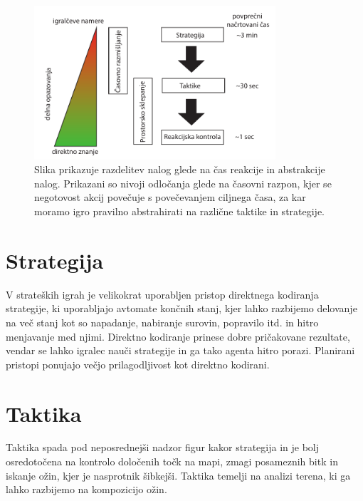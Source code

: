 \documentclass[a4paper, 12pt]{book}
\begin{document}
\begin{itemize}
\begin{itemize}
	\end{itemize}

	\begin{figure}[h]
		\begin{center}
			\includegraphics[width=0.8\textwidth]{photos/RazdelitevNalog.pdf}
		\end{center}
		\caption{Slika prikazuje razdelitev nalog glede na čas reakcije in abstrakcije nalog. 
			Prikazani so nivoji odločanja glede na časovni razpon, kjer se negotovost akcij povečuje s povečevanjem ciljnega časa, za kar moramo igro pravilno abstrahirati na različne taktike in strategije. }
		\label{picRazdelitevNalog}
	\end{figure}

\end{itemize}

\section{Strategija}
V strateških igrah je velikokrat uporabljen pristop direktnega kodiranja strategije, ki uporabljajo avtomate končnih stanj, kjer lahko razbijemo delovanje na več stanj kot so napadanje, nabiranje surovin, popravilo itd. in hitro menjavanje med njimi. 
Direktno kodiranje prinese dobre pričakovane rezultate, vendar se lahko igralec nauči strategije in ga tako agenta hitro porazi.
Planirani pristopi ponujajo večjo prilagodljivost kot direktno kodirani.
\section{Taktika}
Taktika spada pod neposrednejši nadzor figur kakor strategija in je bolj osredotočena na kontrolo določenih točk na mapi, zmagi posameznih bitk in iskanje ožin, kjer je nasprotnik šibkejši. 
Taktika temelji na analizi terena, ki ga lahko razbijemo na kompozicijo ožin.
\end{document}
